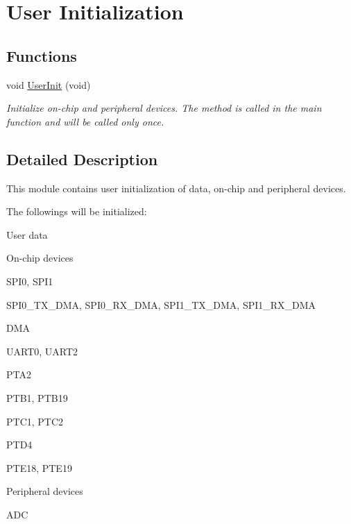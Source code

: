 \hypertarget{group___user_initialization}{\section{User Initialization}
\label{group___user_initialization}
}
\subsection*{Functions}
\begin{DoxyCompactItemize}
\item 
void \hyperlink{group___user_initialization_ga655d748c28aad5b529f5826b50fe1251}{User\-Init} (void)
\begin{DoxyCompactList}\small\item\em Initialize on-\/chip and peripheral devices. The method is called in the main function and will be called only once. \end{DoxyCompactList}\end{DoxyCompactItemize}


\subsection{Detailed Description}
This module contains user initialization of data, on-\/chip and peripheral devices. 

The followings will be initialized\-:


\begin{DoxyItemize}
\item User data 
\item On-\/chip devices 
\begin{DoxyItemize}
\item S\-P\-I0, S\-P\-I1 
\item S\-P\-I0\-\_\-\-T\-X\-\_\-\-D\-M\-A, S\-P\-I0\-\_\-\-R\-X\-\_\-\-D\-M\-A, S\-P\-I1\-\_\-\-T\-X\-\_\-\-D\-M\-A, S\-P\-I1\-\_\-\-R\-X\-\_\-\-D\-M\-A 
\item D\-M\-A 
\item U\-A\-R\-T0, U\-A\-R\-T2 
\item P\-T\-A2 
\item P\-T\-B1, P\-T\-B19 
\item P\-T\-C1, P\-T\-C2 
\item P\-T\-D4 
\item P\-T\-E18, P\-T\-E19 
\end{DoxyItemize}
\item Peripheral devices 
\begin{DoxyItemize}
\item A\-D\-C 
\end{DoxyItemize}
\end{DoxyItemize}

